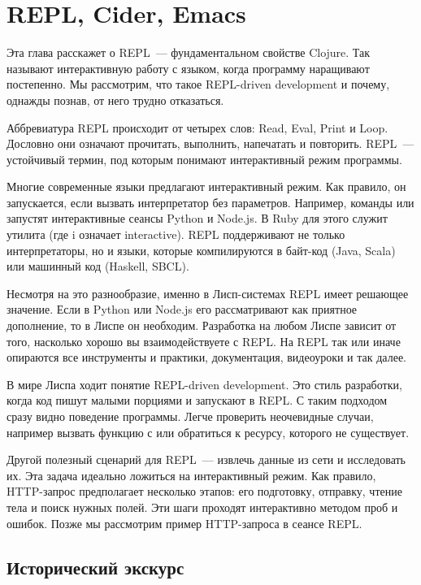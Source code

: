 \chapter{REPL, Cider, Emacs}

\begin{teaser}
Эта глава расскажет о REPL~--- фундаментальном свойстве Clojure. Так называют интерактивную работу с языком, когда программу наращивают постепенно. Мы рассмотрим, что такое REPL-driven development и почему, однажды познав, от него трудно отказаться.
\end{teaser}

Аббревиатура REPL происходит от четырех слов: Read, Eval, Print и Loop. Дословно они означают прочитать, выполнить, напечатать и повторить. REPL~--- устойчивый термин, под которым понимают интерактивный режим программы.

Многие современные языки предлагают интерактивный режим. Как правило, он запускается, если вызвать интерпретатор без параметров. Например, команды  или  запустят интерактивные сеансы Python и Node.js. В Ruby для этого служит утилита  (где i означает interactive). REPL поддерживают не только интерпретаторы, но и языки, которые компилируются в байт-код (Java, Scala) или машинный код (Haskell, SBCL).

Несмотря на это разнообразие, именно в Лисп-системах REPL имеет решающее значение. Если в Python или Node.js его рассматривают как приятное дополнение, то в Лиспе он необходим. Разработка на любом Лиспе зависит от того, насколько хорошо вы взаимодействуете с REPL. На REPL так или иначе опираются все инструменты и практики, документация, видеоуроки и так далее.

В мире Лиспа ходит понятие REPL-driven development. Это стиль разработки, когда код пишут малыми порциями и запускают в REPL. С таким подходом сразу видно поведение программы. Легче проверить неочевидные случаи, например вызвать функцию с  или обратиться к ресурсу, которого не существует.

Другой полезный сценарий для REPL~--- извлечь данные из сети и исследовать их. Эта задача идеально ложиться на интерактивный режим. Как правило, HTTP-запрос предполагает несколько этапов: его подготовку, отправку, чтение тела и поиск нужных полей. Эти шаги проходят интерактивно методом проб и ошибок. Позже мы рассмотрим пример HTTP-запроса в сеансе REPL.

\section{Исторический экскурс}


